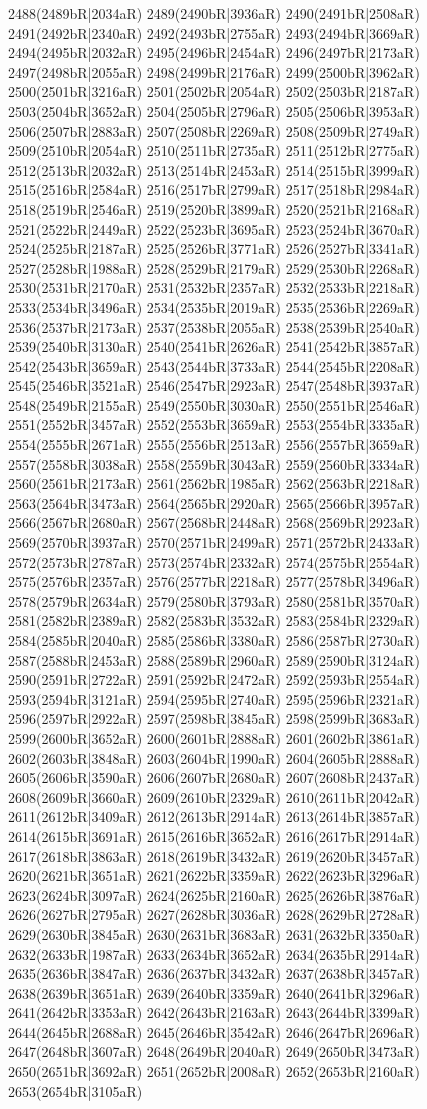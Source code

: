 2488(2489bR|2034aR) 2489(2490bR|3936aR) 2490(2491bR|2508aR) 2491(2492bR|2340aR) 2492(2493bR|2755aR) 2493(2494bR|3669aR) 2494(2495bR|2032aR) 2495(2496bR|2454aR) 2496(2497bR|2173aR) 2497(2498bR|2055aR) 2498(2499bR|2176aR) 2499(2500bR|3962aR) 2500(2501bR|3216aR) 2501(2502bR|2054aR) 2502(2503bR|2187aR) 2503(2504bR|3652aR) 2504(2505bR|2796aR) 2505(2506bR|3953aR) 2506(2507bR|2883aR) 2507(2508bR|2269aR) 2508(2509bR|2749aR) 2509(2510bR|2054aR) 2510(2511bR|2735aR) 2511(2512bR|2775aR) 2512(2513bR|2032aR) 2513(2514bR|2453aR) 2514(2515bR|3999aR) 2515(2516bR|2584aR) 2516(2517bR|2799aR) 2517(2518bR|2984aR) 2518(2519bR|2546aR) 2519(2520bR|3899aR) 2520(2521bR|2168aR) 2521(2522bR|2449aR) 2522(2523bR|3695aR) 2523(2524bR|3670aR) 2524(2525bR|2187aR) 2525(2526bR|3771aR) 2526(2527bR|3341aR) 2527(2528bR|1988aR) 2528(2529bR|2179aR) 2529(2530bR|2268aR) 2530(2531bR|2170aR) 2531(2532bR|2357aR) 2532(2533bR|2218aR) 2533(2534bR|3496aR) 2534(2535bR|2019aR) 2535(2536bR|2269aR) 2536(2537bR|2173aR) 2537(2538bR|2055aR) 2538(2539bR|2540aR) 2539(2540bR|3130aR) 2540(2541bR|2626aR) 2541(2542bR|3857aR) 2542(2543bR|3659aR) 2543(2544bR|3733aR) 2544(2545bR|2208aR) 2545(2546bR|3521aR) 2546(2547bR|2923aR) 2547(2548bR|3937aR) 2548(2549bR|2155aR) 2549(2550bR|3030aR) 2550(2551bR|2546aR) 2551(2552bR|3457aR) 2552(2553bR|3659aR) 2553(2554bR|3335aR) 2554(2555bR|2671aR) 2555(2556bR|2513aR) 2556(2557bR|3659aR) 2557(2558bR|3038aR) 2558(2559bR|3043aR) 2559(2560bR|3334aR) 2560(2561bR|2173aR) 2561(2562bR|1985aR) 2562(2563bR|2218aR) 2563(2564bR|3473aR) 2564(2565bR|2920aR) 2565(2566bR|3957aR) 2566(2567bR|2680aR) 2567(2568bR|2448aR) 2568(2569bR|2923aR) 2569(2570bR|3937aR) 2570(2571bR|2499aR) 2571(2572bR|2433aR) 2572(2573bR|2787aR) 2573(2574bR|2332aR) 2574(2575bR|2554aR) 2575(2576bR|2357aR) 2576(2577bR|2218aR) 2577(2578bR|3496aR) 2578(2579bR|2634aR) 2579(2580bR|3793aR) 2580(2581bR|3570aR) 2581(2582bR|2389aR) 2582(2583bR|3532aR) 2583(2584bR|2329aR) 2584(2585bR|2040aR) 2585(2586bR|3380aR) 2586(2587bR|2730aR) 2587(2588bR|2453aR) 2588(2589bR|2960aR) 2589(2590bR|3124aR) 2590(2591bR|2722aR) 2591(2592bR|2472aR) 2592(2593bR|2554aR) 2593(2594bR|3121aR) 2594(2595bR|2740aR) 2595(2596bR|2321aR) 2596(2597bR|2922aR) 2597(2598bR|3845aR) 2598(2599bR|3683aR) 2599(2600bR|3652aR) 2600(2601bR|2888aR) 2601(2602bR|3861aR) 2602(2603bR|3848aR) 2603(2604bR|1990aR) 2604(2605bR|2888aR) 2605(2606bR|3590aR) 2606(2607bR|2680aR) 2607(2608bR|2437aR) 2608(2609bR|3660aR) 2609(2610bR|2329aR) 2610(2611bR|2042aR) 2611(2612bR|3409aR) 2612(2613bR|2914aR) 2613(2614bR|3857aR) 2614(2615bR|3691aR) 2615(2616bR|3652aR) 2616(2617bR|2914aR) 2617(2618bR|3863aR) 2618(2619bR|3432aR) 2619(2620bR|3457aR) 2620(2621bR|3651aR) 2621(2622bR|3359aR) 2622(2623bR|3296aR) 2623(2624bR|3097aR) 2624(2625bR|2160aR) 2625(2626bR|3876aR) 2626(2627bR|2795aR) 2627(2628bR|3036aR) 2628(2629bR|2728aR) 2629(2630bR|3845aR) 2630(2631bR|3683aR) 2631(2632bR|3350aR) 2632(2633bR|1987aR) 2633(2634bR|3652aR) 2634(2635bR|2914aR) 2635(2636bR|3847aR) 2636(2637bR|3432aR) 2637(2638bR|3457aR) 2638(2639bR|3651aR) 2639(2640bR|3359aR) 2640(2641bR|3296aR) 2641(2642bR|3353aR) 2642(2643bR|2163aR) 2643(2644bR|3399aR) 2644(2645bR|2688aR) 2645(2646bR|3542aR) 2646(2647bR|2696aR) 2647(2648bR|3607aR) 2648(2649bR|2040aR) 2649(2650bR|3473aR) 2650(2651bR|3692aR) 2651(2652bR|2008aR) 2652(2653bR|2160aR) 2653(2654bR|3105aR) 